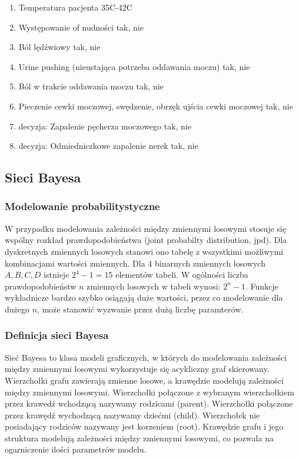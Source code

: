 \documentclass{article}
\begin{document}
\begin{enumerate}
	\item Temperatura pacjenta 35C-42C
	\item Występowanie of nudności tak, nie
	\item Ból lędźwiowy tak, nie
	\item Urine pushing (nieustająca potrzeba oddawania moczu) tak, nie
	\item Ból w trakcie oddawania moczu tak, nie
	\item Pieczenie cewki moczowej, swędzenie, obrzęk ujścia cewki moczowej tak, nie
	\item decyzja: Zapalenie pęcherza moczowego tak, nie
	\item decyzja: Odmiedniczkowe zapalenie nerek tak, nie
\end{enumerate}


\subsection{Sieci Bayesa}

\subsubsection{Modelowanie probabilitystyczne}
W przypadku modelowania zależności między zmiennymi losowymi stosuje się wspólny rozkład prawdopodobieństwa (joint probabilty distribution, jpd). Dla dyskretnych zmiennych losowych stanowi ono tabelę z wszystkimi możliwymi kombinacjami wartości zmiennych. Dla 4 binarnych zmiennych losowych $A, B, C, D$ istnieje $2^4-1 = 15$ elementów tabeli. W ogólności liczba prawdopodobieństw $n$ zmiennych losowych w tabeli wynosi: $2^n - 1$. Funkcje wykładnicze bardzo szybko osiągają duże wartości, przez co modelowanie dla dużego $n$, może stanowić wyzwanie przez dużą liczbę paramterów.

\subsubsection{Definicja sieci Bayesa}
Sieć Bayesa to klasa modeli graficznych, w których do modelowania zależności między zmiennymi losowymi wykorzystuje się acykliczny graf skierowany. Wierzchołki grafu zawierają zmienne losowe, a krawędzie modelują zależności między zmiennymi losowymi. Wierzchołki połączone z wybranym wierzchołkiem przez krawedź wchodzącą nazywamy rodzicami (parent). Wierzchołki połączone przez krawędź wychodzącą nazywamy dziećmi (child). Wierzchołek nie posiadający rodziców nazywany jest korzeniem (root). Krawędzie grafu i jego struktura modelują zależności między zmiennymi losowymi, co pozwala na ogarniczenie ilości parametrów modelu.
\end{document}

